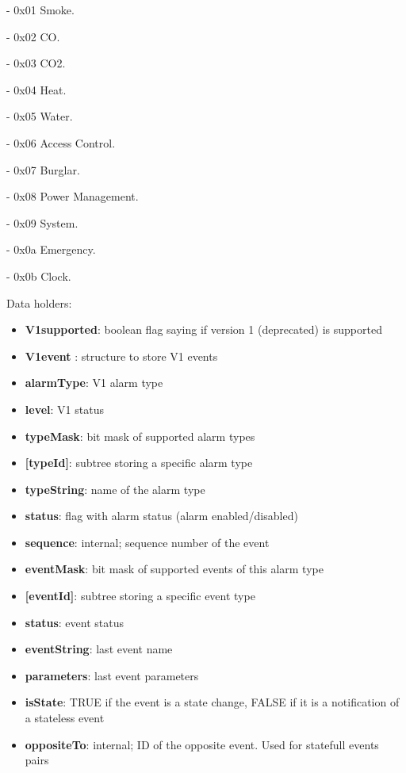 - 0x01 Smoke. 

- 0x02 CO. 

- 0x03 CO2. 

- 0x04 Heat. 

- 0x05 Water. 

- 0x06 Access Control. 

- 0x07 Burglar. 

- 0x08 Power Management. 

- 0x09 System. 

- 0x0a Emergency. 

- 0x0b Clock.
\newline

\noindent
Data holders:

\begin{itemize}
\item \textbf{V1supported}: boolean flag saying if version 1 (deprecated) is supported
\item \textbf{V1event }: structure to store V1 events
\item \qquad\textbf{alarmType}: V1 alarm type
\item \qquad\textbf{level}: V1 status
\item \textbf{typeMask}: bit mask of supported alarm types
\item \textbf{[typeId]}: subtree storing a specific alarm type
\item \qquad\textbf{typeString}: name of the alarm type
\item \qquad\textbf{status}: flag with alarm status (alarm enabled/disabled)
\item \qquad\textbf{sequence}: internal; sequence number of the event
\item \qquad\textbf{eventMask}: bit mask of supported events of this alarm type
\item \qquad\textbf{[eventId]}: subtree storing a specific event type
\item \qquad\qquad\textbf{status}: event status
\item \qquad\qquad\textbf{eventString}: last event name
\item \qquad\qquad\textbf{parameters}: last event parameters
\item \qquad\qquad\textbf{isState}: TRUE if the event is a state change, FALSE if it is a notification of a stateless event
\item \qquad\qquad\textbf{oppositeTo}: internal; ID of the opposite event. Used for statefull events pairs
\end{itemize}


